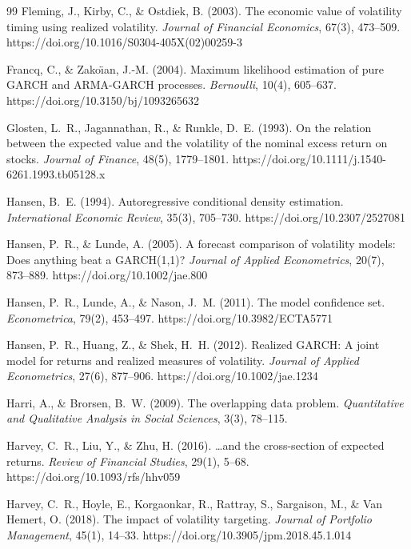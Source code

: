\documentclass[12pt,a4paper]{article}
\begin{document}
\begin{thebibliography}{99}
Fleming, J., Kirby, C., \& Ostdiek, B. (2003). The economic value of volatility timing using realized volatility. \textit{Journal of Financial Economics}, 67(3), 473--509. https://doi.org/10.1016/S0304-405X(02)00259-3

Francq, C., \& Zako\"{\i}an, J.-M. (2004). Maximum likelihood estimation of pure GARCH and ARMA-GARCH processes. \textit{Bernoulli}, 10(4), 605--637. https://doi.org/10.3150/bj/1093265632

Glosten, L.~R., Jagannathan, R., \& Runkle, D.~E. (1993). On the relation between the expected value and the volatility of the nominal excess return on stocks. \textit{Journal of Finance}, 48(5), 1779--1801. https://doi.org/10.1111/j.1540-6261.1993.tb05128.x

Hansen, B.~E. (1994). Autoregressive conditional density estimation. \textit{International Economic Review}, 35(3), 705--730. https://doi.org/10.2307/2527081

Hansen, P.~R., \& Lunde, A. (2005). A forecast comparison of volatility models: Does anything beat a GARCH(1,1)? \textit{Journal of Applied Econometrics}, 20(7), 873--889. https://doi.org/10.1002/jae.800

Hansen, P.~R., Lunde, A., \& Nason, J.~M. (2011). The model confidence set. \textit{Econometrica}, 79(2), 453--497. https://doi.org/10.3982/ECTA5771

Hansen, P.~R., Huang, Z., \& Shek, H.~H. (2012). Realized GARCH: A joint model for returns and realized measures of volatility. \textit{Journal of Applied Econometrics}, 27(6), 877--906. https://doi.org/10.1002/jae.1234

Harri, A., \& Brorsen, B.~W. (2009). The overlapping data problem. \textit{Quantitative and Qualitative Analysis in Social Sciences}, 3(3), 78--115.

Harvey, C.~R., Liu, Y., \& Zhu, H. (2016). \ldots and the cross-section of expected returns. \textit{Review of Financial Studies}, 29(1), 5--68. https://doi.org/10.1093/rfs/hhv059

Harvey, C.~R., Hoyle, E., Korgaonkar, R., Rattray, S., Sargaison, M., \& Van Hemert, O. (2018). The impact of volatility targeting. \textit{Journal of Portfolio Management}, 45(1), 14--33. https://doi.org/10.3905/jpm.2018.45.1.014


\end{thebibliography}
\end{document}
